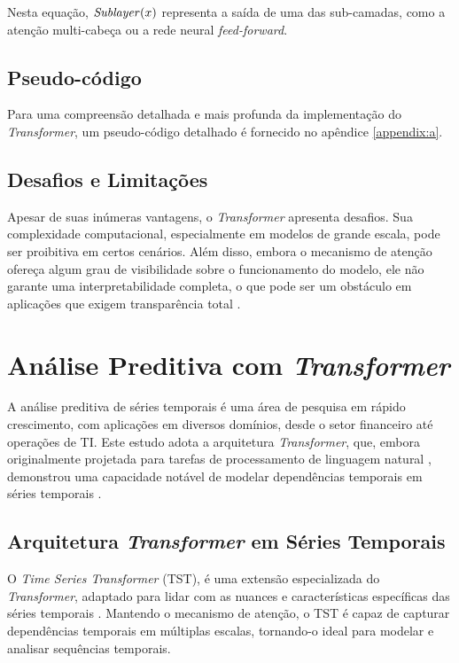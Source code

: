 Nesta equação, \(\text{\textit{Sublayer}}(x)\) representa a saída de uma das sub-camadas, como a atenção multi-cabeça ou a rede neural \textit{feed-forward}.


\subsection{Pseudo-código}
Para uma compreensão detalhada e mais profunda da implementação do \textit{Transformer}, um pseudo-código detalhado é fornecido no apêndice \ref{appendix:a}.

\subsection{Desafios e Limitações}
Apesar de suas inúmeras vantagens, o \textit{Transformer} apresenta desafios. Sua complexidade computacional, especialmente em modelos de grande escala, pode ser proibitiva em certos cenários. Além disso, embora o mecanismo de atenção ofereça algum grau de visibilidade sobre o funcionamento do modelo, ele não garante uma interpretabilidade completa, o que pode ser um obstáculo em aplicações que exigem transparência total \cite{jiang2019attention}.


\section{Análise Preditiva com \textit{Transformer}} \label{cap-anal-pre-trans-ts}

A análise preditiva de séries temporais é uma área de pesquisa em rápido crescimento, com aplicações em diversos domínios, desde o setor financeiro até operações de TI. Este estudo adota a arquitetura \textit{Transformer}, que, embora originalmente projetada para tarefas de processamento de linguagem natural \cite{vaswani2017attention}, demonstrou uma capacidade notável de modelar dependências temporais em séries temporais \cite{lim2019temporal}.


\subsection{Arquitetura \textit{Transformer} em Séries Temporais}
O \textit{Time Series Transformer} (TST), é uma extensão especializada do \textit{Transformer}, adaptado para lidar com as nuances e características específicas das séries temporais \cite{lim2019temporal}. Mantendo o mecanismo de atenção, o TST é capaz de capturar dependências temporais em múltiplas escalas, tornando-o ideal para modelar e analisar sequências temporais.

